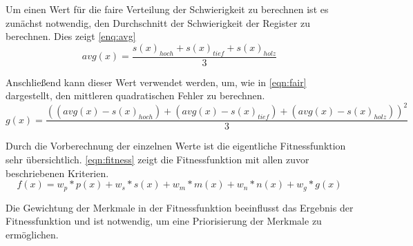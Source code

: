Um einen Wert für die faire Verteilung der Schwierigkeit zu berechnen ist es zunächst notwendig, den Durchschnitt der
Schwierigkeit der Register zu berechnen. Dies zeigt \autoref{enq:avg}
\begin{equation}
    avg(x) = \frac{s(x)_{hoch} + s(x)_{tief} + s(x)_{holz}}{3}
    \label{enq:avg}
\end{equation}

Anschließend kann dieser Wert verwendet werden, um, wie in \autoref{eqn:fair} dargestellt,
den mittleren quadratischen Fehler zu berechnen.
\begin{equation}
    g(x) = \frac{((avg(x) - s(x)_{hoch}) + (avg(x) - s(x)_{tief}) +(avg(x) - s(x)_{holz}))^2}{3}
    \label{eqn:fair}
\end{equation}



Durch die Vorberechnung der einzelnen Werte ist die eigentliche Fitnessfunktion sehr übersichtlich.
\autoref{eqn:fitness} zeigt die Fitnessfunktion mit allen zuvor beschriebenen Kriterien.
\begin{equation}
    f(x) = w_p * p(x) + w_s * s(x) + w_m * m(x) + w_n * n(x) +  w_g * g(x)
    \label{eqn:fitness}
\end{equation}



Die Gewichtung der Merkmale in der Fitnessfunktion beeinflusst das Ergebnis der Fitnessfunktion und
ist notwendig, um eine Priorisierung der Merkmale zu ermöglichen.